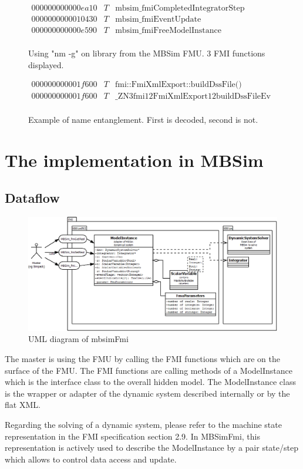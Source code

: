 \documentclass[10pt,a4paper]{report}
\begin{document}
\begin{figure}
  \centering
  $
  \begin{array}{lll} 
  000000000000ea10 & T & \text{mbsim\_fmiCompletedIntegratorStep} \\ 
  0000000000010430 & T & \text{mbsim\_fmiEventUpdate} \\
  000000000000e590 & T & \text{mbsim\_fmiFreeModelInstance} \\
  \end{array}
  $
  \caption{Using "nm -g" on library from the MBSim FMU. 3 FMI functions displayed.}
  \label{fig:libraryName}
  
  $
  \begin{array}{lll} 
  000000000001f600 & T & \text{fmi::FmiXmlExport::buildDssFile()} \\
  000000000001f600 & T & \text{\_ZN3fmi12FmiXmlExport12buildDssFileEv} \\
  \end{array}
  $
  \caption{Example of name entanglement. First is decoded, second is not.}
  \label{fig:entanglement}
\end{figure}
%
\chapter{The implementation in MBSim}
%
\section{Dataflow}
%
\begin{figure}[h]
	\centering
	\includegraphics[width=\textwidth]{fmi-uml}
	\caption{UML diagram of mbsimFmi}
	\label{fig:uml}
\end{figure}
%
The master is using the FMU by calling the FMI functions which are on the surface of the FMU. The FMI functions are calling methods of a ModelInstance which is the interface class to the overall hidden model. The ModelInstance class is the wrapper or adapter of the dynamic system described internally or by the flat XML.\par
%
Regarding the solving of a dynamic system, please refer to the machine state representation in the FMI specification section 2.9. In MBSimFmi, this representation is actively used to describe the ModelInstance by a pair state/step which allows to control data access and update.
%
\end{document}

